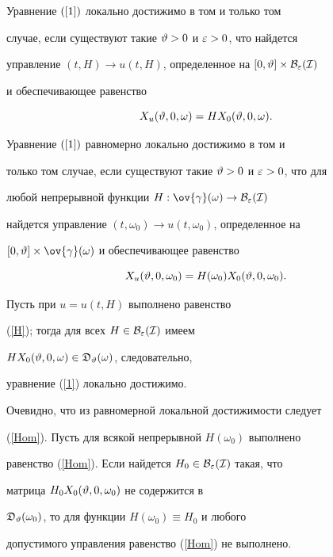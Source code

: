 \begin{lem}


\label{l2}


Уравнение $(\ref{1})$ локально достижимо в том и только том


случае, если существуют такие $\vartheta>0$ и $\varepsilon>0$, что найдется


управление $(t,H)\to u(t,H)$, определенное на $[0,\vartheta]\times\cal B_{\varepsilon}(I)$


и обеспечивающее равенство


\begin{equation}


\label{H}


X_u(\vt,0,\omega)=HX_0(\vt,0,\omega).


\end{equation}


Уравнение $(\ref{1})$ равномерно локально достижимо в том и


только том случае, если существуют такие $\vartheta>0$ и $\varepsilon>0$, что для


любой непрерывной функции $H:\ov{\gamma}(\omega)\to\cal B_{\ve}(I)$


найдется управление $(t,\omega_0)\to u(t,\omega_0)$, определенное на


$[0,\vt]\times\ov{\gamma}(\omega)$ и обеспечивающее равенство


\begin{equation}


\label{Hom}


X_u(\vt,0,\omega_0)=H(\omega_0)X_0(\vt,0,\omega_0).


\end{equation}


\end{lem}





\begin{pf} Пусть при $u=u(t,H)$ выполнено равенство


(\ref{H}); тогда для всех $H\in\cal B_{\varepsilon}(I)$ имеем


$HX_0(\vartheta,0,\omega)\in\frak D_{\vartheta}(\omega)$, следовательно,


уравнение (\ref{1}) локально достижимо.





Очевидно, что из равномерной локальной достижимости следует


(\ref{Hom}). Пусть для всякой непрерывной $H(\omega_0)$ выполнено


равенство (\ref{Hom}). Если найдется $H_0\in\cal B_{\varepsilon}(I)$ такая, что


матрица $H_0X_0(\vartheta,0,\omega_0)$ не содержится в


$\frak D_{\vartheta}(\omega_0)$, то для функции $H(\omega_0)\equiv H_0$ и любого


допустимого управления равенство (\ref{Hom}) не выполнено.


\end{pf}





